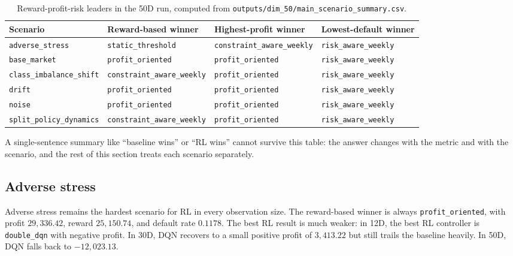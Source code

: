 \documentclass[12pt,a4paper]{article}
\begin{document}
\begin{table}[H]
    \centering
    \footnotesize
    \setlength{\tabcolsep}{4pt}
    \begin{tabularx}{\textwidth}{>{\raggedright\arraybackslash}X
            >{\raggedright\arraybackslash}X
            >{\raggedright\arraybackslash}X
            >{\raggedright\arraybackslash}X}
        \toprule
        Scenario                         & Reward-based winner                & Highest-profit winner              & Lowest-default winner        \\
        \midrule
        \texttt{adverse\_stress}         & \texttt{static\_threshold}         & \texttt{constraint\_aware\_weekly} & \texttt{risk\_aware\_weekly} \\
        \texttt{base\_market}            & \texttt{profit\_oriented}          & \texttt{profit\_oriented}          & \texttt{risk\_aware\_weekly} \\
        \texttt{class\_imbalance\_shift} & \texttt{constraint\_aware\_weekly} & \texttt{profit\_oriented}          & \texttt{risk\_aware\_weekly} \\
        \texttt{drift}                   & \texttt{profit\_oriented}          & \texttt{profit\_oriented}          & \texttt{risk\_aware\_weekly} \\
        \texttt{noise}                   & \texttt{profit\_oriented}          & \texttt{profit\_oriented}          & \texttt{risk\_aware\_weekly} \\
        \texttt{split\_policy\_dynamics} & \texttt{constraint\_aware\_weekly} & \texttt{profit\_oriented}          & \texttt{risk\_aware\_weekly} \\
        \bottomrule
    \end{tabularx}
    \caption{Reward-profit-risk leaders in the 50D run, computed from \texttt{outputs/dim\_50/main\_scenario\_summary.csv}.}
    \label{tab:en-scenario-tradeoff-50}
\end{table}

A single-sentence summary like ``baseline wins'' or ``RL wins'' cannot survive this table: the answer changes with the metric and with the scenario, and the rest of this section treats each scenario separately.

\subsection{Adverse stress}

Adverse stress remains the hardest scenario for RL in every observation size. The reward-based winner is always \texttt{profit\_oriented}, with profit $29{,}336.42$, reward $25{,}150.74$, and default rate $0.1178$. The best RL result is much weaker: in 12D, the best RL controller is \texttt{double\_dqn} with negative profit. In 30D, DQN recovers to a small positive profit of $3{,}413.22$ but still trails the baseline heavily. In 50D, DQN falls back to $-12{,}023.13$.
\end{document}
